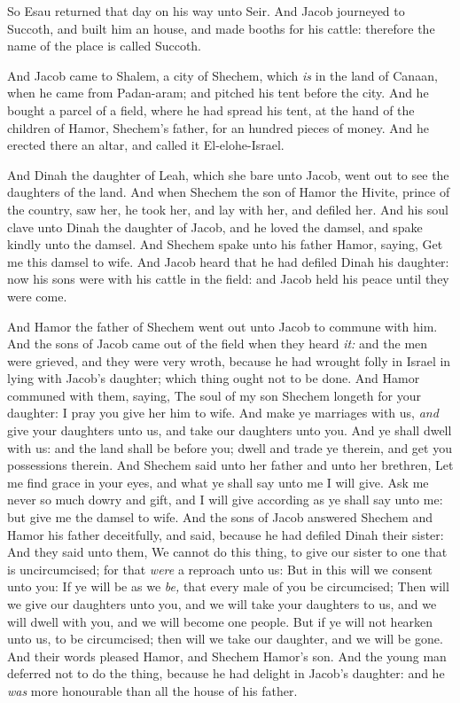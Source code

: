 \documentclass[11pt,letterpaper,oneside]{memoir}
\begin{document}
So Esau returned that day on his way unto Seir. And Jacob journeyed to
Succoth, and built him an house, and made booths for his cattle:
therefore the name of the place is called Succoth.

And Jacob came to Shalem, a city of Shechem, which \emph{is} in the land
of Canaan, when he came from Padan-aram; and pitched his tent before the
city. And he bought a parcel of a field, where he had spread his tent,
at the hand of the children of Hamor, Shechem's father, for an hundred
pieces of money. And he erected there an altar, and called it
El-elohe-Israel.

And Dinah the daughter of Leah, which she bare unto Jacob, went out to
see the daughters of the land. And when Shechem the son of Hamor the
Hivite, prince of the country, saw her, he took her, and lay with her,
and defiled her. And his soul clave unto Dinah the daughter of Jacob,
and he loved the damsel, and spake kindly unto the damsel. And Shechem
spake unto his father Hamor, saying, Get me this damsel to wife. And
Jacob heard that he had defiled Dinah his daughter: now his sons were
with his cattle in the field: and Jacob held his peace until they were
come.

And Hamor the father of Shechem went out unto Jacob to commune with him.
And the sons of Jacob came out of the field when they heard \emph{it:}
and the men were grieved, and they were very wroth, because he had
wrought folly in Israel in lying with Jacob's daughter; which thing
ought not to be done. And Hamor communed with them, saying, The soul of
my son Shechem longeth for your daughter: I pray you give her him to
wife. And make ye marriages with us, \emph{and} give your daughters unto
us, and take our daughters unto you. And ye shall dwell with us: and the
land shall be before you; dwell and trade ye therein, and get you
possessions therein. And Shechem said unto her father and unto her
brethren, Let me find grace in your eyes, and what ye shall say unto me
I will give. Ask me never so much dowry and gift, and I will give
according as ye shall say unto me: but give me the damsel to wife. And
the sons of Jacob answered Shechem and Hamor his father deceitfully, and
said, because he had defiled Dinah their sister: And they said unto
them, We cannot do this thing, to give our sister to one that is
uncircumcised; for that \emph{were} a reproach unto us: But in this will
we consent unto you: If ye will be as we \emph{be,} that every male of
you be circumcised; Then will we give our daughters unto you, and we
will take your daughters to us, and we will dwell with you, and we will
become one people. But if ye will not hearken unto us, to be
circumcised; then will we take our daughter, and we will be gone. And
their words pleased Hamor, and Shechem Hamor's son. And the young man
deferred not to do the thing, because he had delight in Jacob's
daughter: and he \emph{was} more honourable than all the house of his
father.
\end{document}
